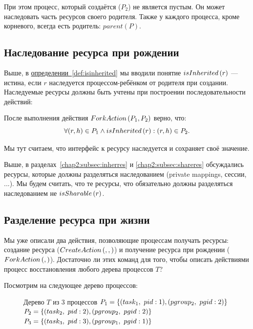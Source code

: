 При этом процесс, который создаётся ($P_2$) не является пустым. Он может наследовать часть ресурсов своего родителя. Также у каждого процесса, кроме корневого, всегда есть родитель: $parent(P)$.

\subsection{Наследование ресурса при рождении}

Выше, в \hyperref[def:isinherited]{определении~\ref{def:isinherited}} мы вводили понятие $isInherited\left( r \right)$ --- истина, если $r$ наследуется процессом-ребёнком от родителя при создании. Наследуемые ресурсы должны быть учтены при построении последовательности действий:

После выполнения действия $ForkAction\left( P_1, P_2 \right)$ верно, что:
\begin{equation}
\label{eq:inherAtFork} 
	\forall (r, h) \in P_1 \land isInherited\left( r \right): (r, h) \in P_2.
\end{equation}

\begin{note}
Мы тут считаем, что интерфейс к ресурсу наследуется и сохраняет своё значение.
\end{note}

Выше, в разделах~\ref{chap2:subsec:inherres} и \ref{chap2:subsec:shareres} обсуждались ресурсы, которые должны разделяться наследованием (private mappings, сессии, ...). Мы будем считать, что те ресурсы, что обязательно должны разделяться наследованием не $isSharable\left( r \right)$.

\subsection{Разделение ресурса при жизни}

Мы уже описали два действия, позволяющие процессам получать ресурсы: создание ресурса ($CreateAction\left( , ,  \right)$) и получение ресурса при рождении ($ForkAction\left( ,  \right)$). Достаточно ли этих команд для того, чтобы описать действиями процесс восстановления любого дерева процессов $T$?

Посмотрим на следующее дерево процессов:

\begin{figure}[ht!]
\centering
{}
\begin{caption}{Дерево $T$ из 3 процессов}
$P_1 = \xbrace{(task_1,\ pid: 1), (pgroup_2,\ pgid: 2)}$\\
$P_2 = \xbrace{(task_2,\ pid: 2), (pgroup_2,\ pgid: 2)}$\\
$P_3 = \xbrace{(task_3,\ pid: 3), (pgroup_1,\ pgid: 1)}$
\end{caption}
\end{figure}

